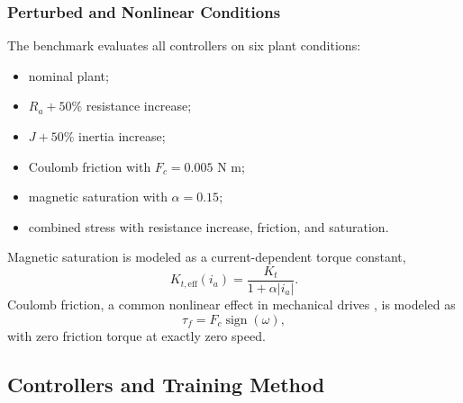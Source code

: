 \documentclass[conference]{IEEEtran}
\begin{document}
\subsubsection{Perturbed and Nonlinear Conditions}
The benchmark evaluates all controllers on six plant conditions:
\begin{itemize}
    \item nominal plant;
    \item $R_a+50\%$ resistance increase;
    \item $J+50\%$ inertia increase;
    \item Coulomb friction with $F_c = 0.005$ N m;
    \item magnetic saturation with $\alpha = 0.15$;
    \item combined stress with resistance increase, friction, and saturation.
\end{itemize}

Magnetic saturation is modeled as a current-dependent torque constant,
\begin{equation}
K_{t,\mathrm{eff}}(i_a) = \frac{K_t}{1 + \alpha |i_a|}.
\end{equation}
Coulomb friction, a common nonlinear effect in mechanical drives \cite{armstrong1994}, is modeled as
\begin{equation}
\tau_f = F_c \operatorname{sign}(\omega),
\end{equation}
with zero friction torque at exactly zero speed.

\subsection{Controllers and Training Method}
\end{document}
